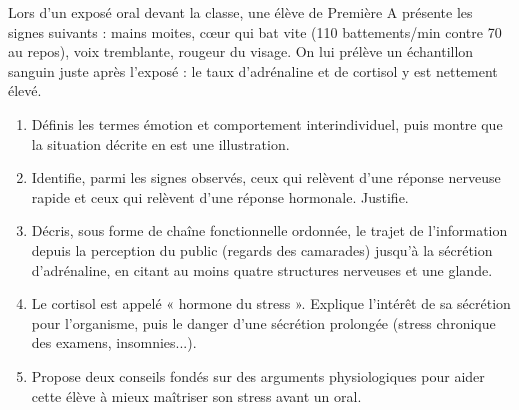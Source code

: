 \documentclass[11pt]{article}
\newcommand{\cle}[1]{{\popxbold\color{popdark}#1}}
\begin{document}
\begin{exercice}
Lors d'un exposé oral devant la classe, une élève de Première A présente les signes suivants : mains moites, cœur qui bat vite (110 battements/min contre 70 au repos), voix tremblante, rougeur du visage. On lui prélève un échantillon sanguin juste après l'exposé : le taux d'adrénaline et de cortisol y est nettement élevé.
\begin{enumerate}
\item Définis les termes \cle{émotion} et \cle{comportement interindividuel}, puis montre que la situation décrite en est une illustration.
\item Identifie, parmi les signes observés, ceux qui relèvent d'une réponse nerveuse rapide et ceux qui relèvent d'une réponse hormonale. Justifie.
\item Décris, sous forme de chaîne fonctionnelle ordonnée, le trajet de l'information depuis la perception du public (regards des camarades) jusqu'à la sécrétion d'adrénaline, en citant au moins quatre structures nerveuses et une glande.
\item Le cortisol est appelé « hormone du stress ». Explique l'intérêt de sa sécrétion pour l'organisme, puis le danger d'une sécrétion prolongée (stress chronique des examens, insomnies...).
\item Propose deux conseils fondés sur des arguments physiologiques pour aider cette élève à mieux maîtriser son stress avant un oral.
\end{enumerate}
\end{exercice}
\end{document}
